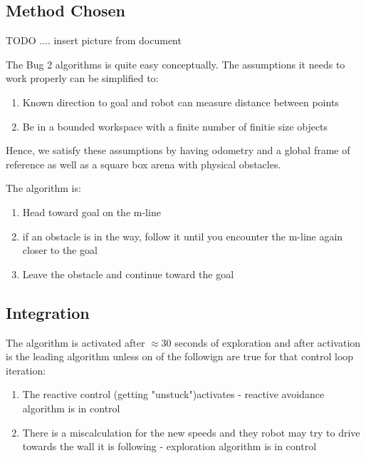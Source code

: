 \documentclass[11pt, a4paper]{article}
\begin{document}
\subsection{Method Chosen}


TODO .... insert picture from document


The Bug 2 algorithms is quite easy conceptually. The assumptions it needs to work properly can be simplified to:

\begin{enumerate}

	\item Known direction to goal and robot can measure distance between points
	\item Be in a bounded workspace with a finite number of finitie size objects

\end{enumerate}

Hence, we satisfy these assumptions by having odometry and a global frame of reference as well 
as a square box arena with physical obstacles.

The algorithm is:

\begin{enumerate}

	\item Head toward goal on the m-line
	\item if an obstacle is in the way, follow it until you encounter the m-line again closer to the goal
	\item Leave the obstacle and continue toward the goal

\end{enumerate}



\subsection{Integration}

The algorithm is activated after $\approx 30$ seconds of exploration\cite{task1_report} and after
activation is the leading algorithm unless on of the followign are true for that control loop iteration:

\begin{enumerate}	

	\item The reactive control (getting "unstuck"\cite{task1_report})activates - reactive avoidance algorithm is in control
	\item There is a miscalculation for the new speeds and they robot may try to drive towards the wall it is following - exploration algorithm is in control

\end{enumerate}
\end{document}
